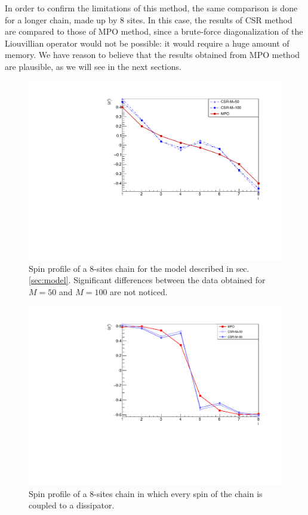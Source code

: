 In order to confirm the limitations of this method, the same comparison is done for a longer chain, made up by 8 sites. In this case, the results of CSR method are compared to those of MPO method, since a brute-force diagonalization of the Liouvillian operator would not be possible: it would require a huge amount of memory. We have reason to believe that the results obtained from MPO method are plausible, as we will see in the next sections.

\begin{figure}[H]
    \centering
    \includegraphics[scale=0.7]{Figures/8sites/1U1D_comparisonCSR_MPO_8site.pdf}
    \caption{Spin profile of a 8-sites chain for the model described in sec.\ref{sec:model}. Significant differences between the data obtained for $M=50$ and $M=100$ are not noticed.}
    \label{fig:1U1D_comparisonCSR_MPO_8site}
\end{figure}

\begin{figure}[H]
    \centering
    \includegraphics[scale=0.7]{Figures/8sites/8sites_MPOvsCORNER_4U4D.pdf}
    \caption{Spin profile of a 8-sites chain in which every spin of the chain is coupled to a dissipator.}
    \label{fig:8sites_MPOvsCORNER_4U4D}
\end{figure}

